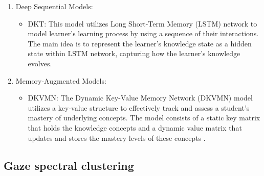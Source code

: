 \begin{enumerate}
    \item Deep Sequential Models: 
    \begin{itemize}
        \item DKT: This model utilizes Long Short-Term Memory (LSTM) network to model learner's learning process by using a sequence of their interactions. The main idea is to represent the learner's knowledge state as a hidden state within LSTM network, capturing how the learner's knowledge evolves\cite{piech2015deepknowledgetracing}.
    \end{itemize}

    \item Memory-Augmented Models:
    \begin{itemize}
        \item DKVMN: The Dynamic Key-Value Memory Network (DKVMN) model utilizes a key-value structure to effectively track and assess a student's mastery of underlying concepts. The model consists of a static key matrix that holds the knowledge concepts and a dynamic value matrix that updates and stores the mastery levels of these concepts \cite{zhang2017dynamickeyvaluememorynetworks}.
    \end{itemize}
\end{enumerate}



\subsection{Gaze spectral clustering}
\label{appendix sub sec: gaze cluster}

